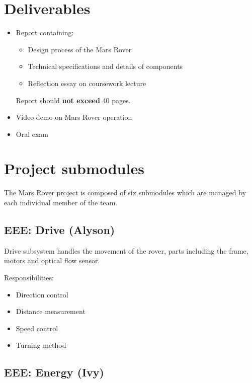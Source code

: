 \documentclass[10pt, a4paper]{article}
\begin{document}
\section{Deliverables}

\begin{itemize}
    \item Report containing:
    \begin{itemize}
        \item Design process of the Mars Rover 
        \item Technical specifications and details of components
        \item Reflection essay on coursework lecture 
    \end{itemize}

    Report should \textbf{not exceed} 40 pages.

    \item Video demo on Mars Rover operation 
    \item Oral exam 
\end{itemize}


\section{Project submodules}

The Mars Rover project is composed of six submodules which are managed by each individual member of the team. 

\subsection{EEE: Drive (Alyson)}

Drive subsystem handles the movement of the rover, parts including the frame, motors and optical flow sensor.

Responsibilities:
\begin{itemize}
    \item Direction control
    \item Distance measurement
    \item Speed control 
    \item Turning method 
\end{itemize}

\subsection{EEE: Energy (Ivy)}
\end{document}
